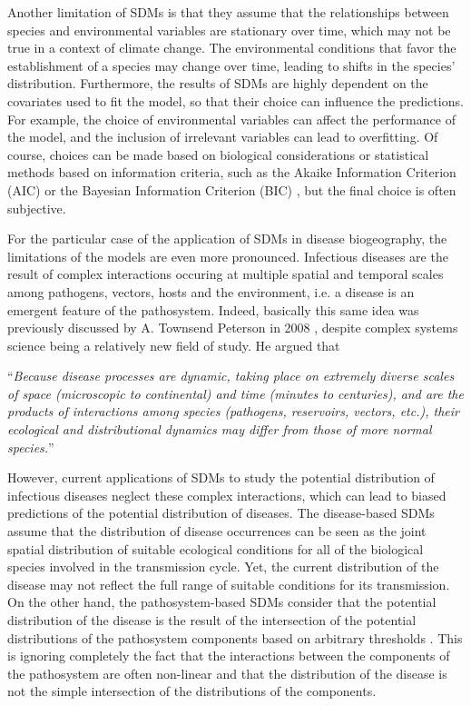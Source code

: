 Another limitation of SDMs is that they assume that the relationships between
species and environmental variables are stationary over time, which may not be
true in a context of climate change. The environmental conditions that favor
the establishment of a species may change over time, leading to shifts in the
species' distribution. Furthermore, the results of SDMs are highly dependent on
the covariates used to fit the model, so that their choice can influence the
predictions. For example, the choice of environmental variables can affect the
performance of the model, and the inclusion of irrelevant variables can lead to
overfitting. Of course, choices can be made based on biological considerations
or statistical methods based on information criteria, such as the Akaike
Information Criterion (AIC) or the Bayesian Information Criterion (BIC)
\cite{Burnham2002}, but the final choice is often subjective.

For the particular case of the application of SDMs in disease biogeography, the
limitations of the models are even more pronounced. Infectious diseases are the
result of complex interactions occuring at multiple spatial and temporal scales
among pathogens, vectors, hosts and the environment, i.e. a disease is an
emergent feature of the pathosystem. Indeed, basically this same idea was
previously discussed by A. Townsend Peterson in 2008 \cite{Peterson2008},
despite complex systems science being a relatively new field of study. He
argued that
\begin{displayquote}
  ``\textit{Because disease processes are dynamic, taking place on extremely
    diverse
    scales of space (microscopic to continental) and time (minutes to
    centuries),
    and are the products of interactions among species (pathogens, reservoirs,
    vectors, etc.), their ecological and distributional dynamics may differ
    from
    those of more normal species.}''
\end{displayquote}

However, current applications of  SDMs to study the potential distribution of
infectious diseases neglect these complex interactions, which can lead to
biased predictions of the potential distribution of diseases. The disease-based
SDMs assume that the distribution of disease occurrences can be seen as the
joint spatial distribution of suitable ecological conditions for all of the
biological species involved in the transmission cycle. Yet, the current
distribution of the disease may not reflect the full range of suitable
conditions for its transmission. On the other hand, the pathosystem-based SDMs
consider that the potential distribution of the disease is the result of the
intersection of the potential distributions of the pathosystem components based
on arbitrary thresholds \cite{Samy2014,Baak2017,YoonLee2023}. This is ignoring
completely the fact that the interactions between the components of the
pathosystem are often non-linear and that the distribution of the disease is
not the simple intersection of the distributions of the components.

